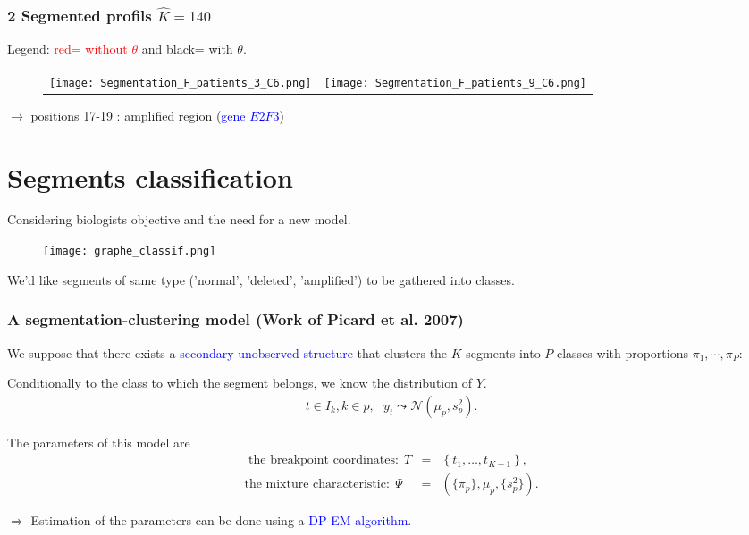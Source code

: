 \documentclass[compress]{beamer}
\begin{document}
\begin{frame}
\frametitle{2 Segmented profils $\hat K=140$ }
Legend: \textcolor{red}{red= without $\theta$} and black= with $\theta$.
\begin{figure}
\begin{tabular}{cc}
\texttt{[image: Segmentation\_F\_patients\_3\_C6.png]}&
\texttt{[image: Segmentation\_F\_patients\_9\_C6.png]}
\end{tabular}
\end{figure}
$\rightarrow$ positions 17-19 : amplified region (\textcolor{blue}{gene $E2F3$})
\end{frame}


\section{Segments classification}
\begin{frame}
Considering biologists objective and the need for a new model.
\begin{figure}
\begin{center}
\texttt{[image: graphe\_classif.png]}
\end{center}
\end{figure}
We'd like segments of same type ('normal', 'deleted', 'amplified') to be gathered into classes.
\end{frame}


\begin{frame}
\frametitle{A segmentation-clustering model (Work of Picard et al. 2007)}
\begin{dinglist}{42}
\item We suppose that there exists a \textcolor{blue}{secondary unobserved structure} that clusters the $K$ segments into $P$ classes with proportions $\pi_1,\cdots,\pi_P$:
\item Conditionally to the class to which the segment belongs, we know the distribution of $Y$.
\begin{eqnarray*}
t\in I_{k}, k\in p, \ \ \ y_{t} \leadsto \mathcal{N}(\mu_p, s_p^2).
\end{eqnarray*}
\item The parameters of this model are
\begin{eqnarray*}
\mbox{ the breakpoint coordinates:} \ \ T  &= &\left\{t_1,\ldots,t_{K-1}\right\},\\ 
\mbox{the mixture characteristic:}\ \  \Psi &= &(\{\pi_p\},{\mu_p}, \{s_p^2\}). 
\end{eqnarray*}
\end{dinglist}
$\Rightarrow$ Estimation of the parameters can be done using a \textcolor{blue}{DP-EM algorithm}.
\end{frame}
\end{document}
